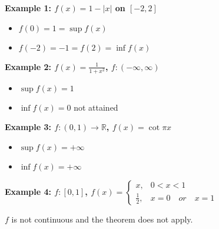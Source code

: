 \documentclass[12pt]{article}
\newcommand{\abs}[1]{\left| #1 \right|}
\theoremstyle{plain}
\begin{document}
    {\color{Brown}
    \textbf{Example 1: $f(x) =1 -\abs x$ on $[-2,2]$}
    \begin{itemize}
        \item $f(0) = 1 = \sup f(x)$
        \item $f(-2) = -1 = f(2) = \inf f(x)$\\
    \end{itemize}

    \textbf{Example 2: $f(x)=\frac 1{1+x^2}$, $f:(-\infty, \infty)$}
    \begin{itemize}
        \item $\sup f(x) = 1$
        \item $\inf f(x) = 0$ not attained \\
    \end{itemize}

    \textbf{Example 3: $f:(0, 1) \to \mathbb{R}$, $f(x) = \cot \pi x$}
    \begin{itemize}
        \item $\sup f(x) = +\infty $
        \item $\inf f(x) = +\infty $\\
    \end{itemize}

    \textbf{Example 4: $f: [0,1]$, $f(x) = \begin{cases}
        x, &0<x<1\\
        \frac 12, & x=0 \quad or \quad x=1
    \end{cases}$}

    $f$ is not continuous and the theorem does not apply.}\\\\
\end{document}
